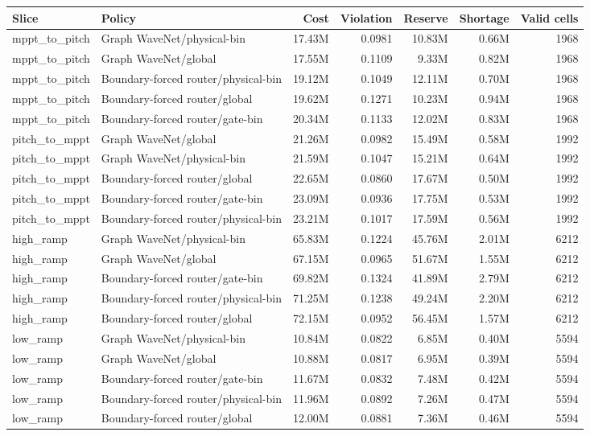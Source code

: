 \begin{tabular}{llrrrrr}
\toprule
Slice & Policy & Cost & Violation & Reserve & Shortage & Valid cells \\
\midrule
mppt\_to\_pitch & Graph WaveNet/physical-bin & 17.43M & 0.0981 & 10.83M & 0.66M & 1968 \\
mppt\_to\_pitch & Graph WaveNet/global & 17.55M & 0.1109 & 9.33M & 0.82M & 1968 \\
mppt\_to\_pitch & Boundary-forced router/physical-bin & 19.12M & 0.1049 & 12.11M & 0.70M & 1968 \\
mppt\_to\_pitch & Boundary-forced router/global & 19.62M & 0.1271 & 10.23M & 0.94M & 1968 \\
mppt\_to\_pitch & Boundary-forced router/gate-bin & 20.34M & 0.1133 & 12.02M & 0.83M & 1968 \\
pitch\_to\_mppt & Graph WaveNet/global & 21.26M & 0.0982 & 15.49M & 0.58M & 1992 \\
pitch\_to\_mppt & Graph WaveNet/physical-bin & 21.59M & 0.1047 & 15.21M & 0.64M & 1992 \\
pitch\_to\_mppt & Boundary-forced router/global & 22.65M & 0.0860 & 17.67M & 0.50M & 1992 \\
pitch\_to\_mppt & Boundary-forced router/gate-bin & 23.09M & 0.0936 & 17.75M & 0.53M & 1992 \\
pitch\_to\_mppt & Boundary-forced router/physical-bin & 23.21M & 0.1017 & 17.59M & 0.56M & 1992 \\
high\_ramp & Graph WaveNet/physical-bin & 65.83M & 0.1224 & 45.76M & 2.01M & 6212 \\
high\_ramp & Graph WaveNet/global & 67.15M & 0.0965 & 51.67M & 1.55M & 6212 \\
high\_ramp & Boundary-forced router/gate-bin & 69.82M & 0.1324 & 41.89M & 2.79M & 6212 \\
high\_ramp & Boundary-forced router/physical-bin & 71.25M & 0.1238 & 49.24M & 2.20M & 6212 \\
high\_ramp & Boundary-forced router/global & 72.15M & 0.0952 & 56.45M & 1.57M & 6212 \\
low\_ramp & Graph WaveNet/physical-bin & 10.84M & 0.0822 & 6.85M & 0.40M & 5594 \\
low\_ramp & Graph WaveNet/global & 10.88M & 0.0817 & 6.95M & 0.39M & 5594 \\
low\_ramp & Boundary-forced router/gate-bin & 11.67M & 0.0832 & 7.48M & 0.42M & 5594 \\
low\_ramp & Boundary-forced router/physical-bin & 11.96M & 0.0892 & 7.26M & 0.47M & 5594 \\
low\_ramp & Boundary-forced router/global & 12.00M & 0.0881 & 7.36M & 0.46M & 5594 \\
\bottomrule
\end{tabular}

